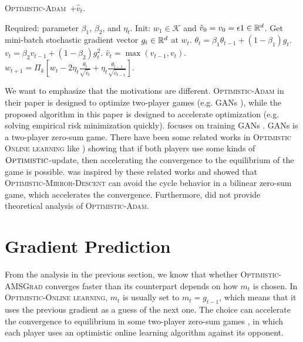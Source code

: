 \documentclass[11pt]{article}
\def\K{\mathcal{K}}
\theoremstyle{k}
\begin{document}
\begin{algorithm}[h]
\begin{algorithmic}[1]
\caption{\textsc{Optimistic-Adam~\cite{DISZ18}+$\hat{v}_t$}. \label{OPT-DISZ}}
\STATE Required: parameter $\beta_1$, $\beta_2$, and $\eta_t$.
\STATE Init: $w_1 \in \K$ and $\hat{v}_0 = v_{0} = \epsilon 1 \in \mathbb{R}^{d}$.
\STATE Get mini-batch stochastic gradient vector $g_t \in \mathbb{R}^d$ at $w_t$.
\STATE $\theta_t = \beta_{1} \theta_{t-1} + (1 - \beta_{1}) g_t$.
\STATE $v_t = \beta_2 v_{t-1} + (1 - \beta_2) g_t^2$.
\STATE $\hat{v}_t = \max( \hat{v}_{t-1} , v_t )$.
\STATE $w_{t+1} = \Pi_{k}[ w_{t} - 2 \eta_t \frac{\theta_t}{ \sqrt{\hat{v}_t }}
+ \eta_t \frac{\theta_{t-1}}{ \sqrt{\hat{v}_{t-1}} }]$.
\ENDFOR
\end{algorithmic}
\end{algorithm}

We want to emphasize that the motivations are different. \textsc{Optimistic-Adam} in their paper is designed to optimize two-player games (e.g. GANs \cite{goodfellow2014generative}),
while the proposed algorithm in this paper is designed to accelerate optimization
(e.g. solving empirical risk minimization quickly).
\cite{DISZ18} focuses on training GANs \cite{goodfellow2014generative}. GANs is a two-player zero-sum game. There have been some related works in \textsc{Optimistic Online learning} like \cite{CJ12,RS13,SALS15})
showing that if both players use some kinds of $\textsc{Optimistic}$-update,
then accelerating the convergence to the equilibrium of the game is possible.
\cite{DISZ18} was inspired by these related works and showed that \textsc{Optimistic-Mirror-Descent}
can avoid the cycle behavior in a bilinear zero-sum game, which accelerates the convergence. Furthermore, \cite{DISZ18} did not provide theoretical analysis of \textsc{Optimistic-Adam}.

\section{Gradient Prediction} \label{sec:predict_m}

From the analysis in the previous section, we know that whether \textsc{Optimistic-AMSGrad}
converges faster than its counterpart depends on how $m_{t}$ is chosen.
In \textsc{Optimistic-Online learning}, $m_{t}$ is usually set to $m_{t}= g_{t-1}$,
which means that it uses the previous gradient as a guess of the next one.
The choice can accelerate the convergence to equilibrium in some two-player zero-sum games
\cite{RS13,SALS15,DISZ18}, in which each player uses an optimistic online learning algorithm
against its opponent.
\end{document}
